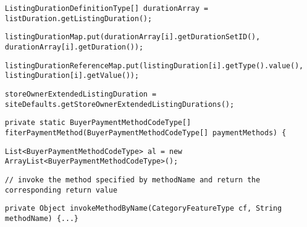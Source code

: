 \begin{lstlisting}[firstnumber=131, caption={Line 131 acceptable violation of the rule}]
ListingDurationDefinitionType[] durationArray = listDuration.getListingDuration();
\end{lstlisting}
\noindent\makebox[\linewidth]{\rule{\linewidth}{0.4pt}}
\begin{lstlisting}[firstnumber=134, caption={Line 134 acceptable violation of the rule}]
listingDurationMap.put(durationArray[i].getDurationSetID(), durationArray[i].getDuration());
\end{lstlisting}
\noindent\makebox[\linewidth]{\rule{\linewidth}{0.4pt}}
\begin{lstlisting}[firstnumber=144, caption={Line 144 acceptable violation of the rule}]
listingDurationReferenceMap.put(listingDuration[i].getType().value(), listingDuration[i].getValue());
\end{lstlisting}
\noindent\makebox[\linewidth]{\rule{\linewidth}{0.4pt}}
\begin{lstlisting}[firstnumber=156, caption={Line 156 acceptable violation of the rule}]
storeOwnerExtendedListingDuration = siteDefaults.getStoreOwnerExtendedListingDurations();
\end{lstlisting}
\noindent\makebox[\linewidth]{\rule{\linewidth}{0.4pt}}
\begin{lstlisting}[firstnumber=162, caption={Line 162 acceptable violation of the rule}]
private static BuyerPaymentMethodCodeType[] fiterPaymentMethod(BuyerPaymentMethodCodeType[] paymentMethods) {
\end{lstlisting}
\noindent\makebox[\linewidth]{\rule{\linewidth}{0.4pt}}
\begin{lstlisting}[firstnumber=163, caption={Line 163 acceptable violation of the rule}]
List<BuyerPaymentMethodCodeType> al = new ArrayList<BuyerPaymentMethodCodeType>();
\end{lstlisting}
\noindent\makebox[\linewidth]{\rule{\linewidth}{0.4pt}}
\begin{lstlisting}[firstnumber=203, caption={Line 203 acceptable violation of the rule}]
// invoke the method specified by methodName and return the corresponding return value
\end{lstlisting}
\noindent\makebox[\linewidth]{\rule{\linewidth}{0.4pt}}
\begin{lstlisting}[firstnumber=208, caption={Line 208 acceptable violation of the rule}]
private Object invokeMethodByName(CategoryFeatureType cf, String methodName) {...}
\end{lstlisting}
